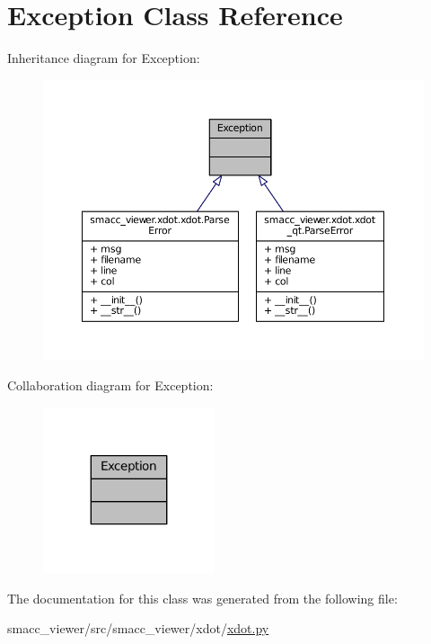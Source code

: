 \hypertarget{classException}{}\section{Exception Class Reference}
\label{classException}


Inheritance diagram for Exception\+:
\nopagebreak
\begin{figure}[H]
\begin{center}
\leavevmode
\includegraphics[width=350pt]{classException__inherit__graph}
\end{center}
\end{figure}


Collaboration diagram for Exception\+:
\nopagebreak
\begin{figure}[H]
\begin{center}
\leavevmode
\includegraphics[width=143pt]{classException__coll__graph}
\end{center}
\end{figure}


The documentation for this class was generated from the following file\+:\begin{DoxyCompactItemize}
\item 
smacc\+\_\+viewer/src/smacc\+\_\+viewer/xdot/\hyperlink{xdot_8py}{xdot.\+py}\end{DoxyCompactItemize}
